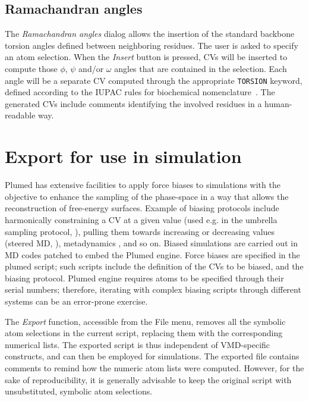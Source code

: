 \documentclass[preprint,12pt]{elsarticle}
\begin{document}
\subsection{Ramachandran angles}

The \emph{Ramachandran angles} dialog allows the insertion of the
standard backbone torsion angles defined between neighboring residues.
The user is asked to specify an atom selection. When the \emph{Insert}
button is pressed, CVs will be inserted to compute those $\phi$,
$\psi$ and/or $\omega$ angles that are contained in the
selection. Each angle will be a separate CV computed through the
appropriate \texttt{TORSION} keyword, defined according to the IUPAC
rules for biochemical nomenclature~\cite{IUPAC}. The generated CVs
include comments identifying the involved residues in a human-readable
way.








\section{Export for use in simulation}\label{sec:export-use-simul}

Plumed has extensive facilities to apply force biases to simulations
with the objective to enhance the sampling of the phase-space in a way
that allows the reconstruction of free-energy surfaces. Example of
biasing protocols include harmonically constraining a CV at a given
value (used e.g. in the umbrella sampling protocol,
\cite{Torrie_Valleau_1977}), pulling them towards increasing or
decreasing values (steered MD,
\cite{Isralewitz_Gao_Schulten_2001,Giorgino_2011}), metadynamics
\cite{Laio_Parrinello_2002}, and so on. Biased simulations are carried
out in MD codes patched to embed the Plumed engine. Force biases are
specified in the plumed script; such scripts include the definition of
the CVs to be biased, and the biasing protocol.  Plumed engine
requires atoms to be specified through their serial numbers;
therefore, iterating with complex biasing scripts through different
systems can be an error-prone exercise.

The \emph{Export} function, accessible from the File menu, removes all
the symbolic atom selections in the current script, replacing them
with the corresponding numerical lists. The exported script is thus
independent of VMD-specific constructs, and can then be employed for
simulations.  The exported file contains comments to remind how the
numeric atom lists were computed. However, for the sake of
reproducibility, it is generally advisable to keep the original
script with unsubstituted, symbolic atom selections.
\end{document}

